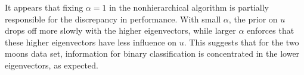 \documentclass{siamart1116}
\begin{document}
It appears that fixing $\alpha = 1$ in the nonhierarchical algorithm is partially responsible for the discrepancy in performance. With small $\alpha$, the prior on $u$ drops off more slowly with the higher eigenvectors, while larger $\alpha$ enforces that these higher eigenvectors have less influence on $u$. This suggests that for the two moons data set, information for binary classification is concentrated in the lower eigenvectors, as expected.



\end{document}
